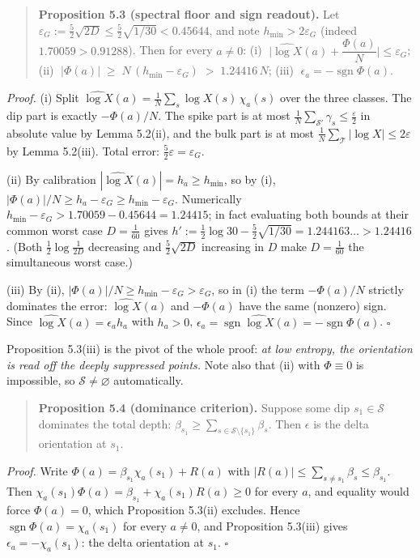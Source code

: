 \documentclass[11pt]{article}
\begin{document}
\begin{quote}
\textbf{Proposition 5.3 (spectral floor and sign readout).}  Let $\varepsilon_G := \tfrac52\sqrt{2D} \le \tfrac52\sqrt{1/30} < 0.45644$, and note $h_{\min} > 2\varepsilon_G$ (indeed $1.70059 > 0.91288$).  Then for every $a \ne 0$:  (i) $\;\Big|\widehat{\log X}(a) + \dfrac{\Phi(a)}{N}\Big| \le \varepsilon_G$;  (ii) $\;|\Phi(a)| \;\ge\; N\,(h_{\min} - \varepsilon_G) \;>\; 1.24416\,N$;  (iii) $\;\epsilon_a = -\operatorname{sgn} \Phi(a)$.
\end{quote}
\emph{Proof.}  (i) Split $\widehat{\log X}(a) = \frac1N\sum_s \log X(s)\, \chi_a(s)$ over the three classes.  The dip part is exactly $-\Phi(a)/N$.  The spike part is at most $\frac1N\sum_{\mathcal S'} \gamma_s \le \frac\varepsilon2$ in absolute value by Lemma 5.2(ii), and the bulk part is at most $\frac1N\sum_{\mathcal T}|\log X| \le 2\varepsilon$ by Lemma 5.2(iii).  Total error: $\frac52\varepsilon = \varepsilon_G$.

(ii) By calibration $|\widehat{\log X}(a)| = h_a \ge h_{\min}$, so by (i), $|\Phi(a)|/N \ge h_a - \varepsilon_G \ge h_{\min} - \varepsilon_G$. Numerically $h_{\min} - \varepsilon_G > 1.70059 - 0.45644 = 1.24415$; in fact evaluating both bounds at their common worst case $D = \tfrac1{60}$ gives $h' := \tfrac12\log30 - \tfrac52\sqrt{1/30} = 1.244163\ldots > 1.24416$.  (Both $\tfrac12\log\tfrac1{2D}$ decreasing and $\tfrac52\sqrt{2D}$ increasing in $D$ make $D = \tfrac1{60}$ the simultaneous worst case.)

(iii) By (ii), $|\Phi(a)|/N \ge h_{\min} - \varepsilon_G > \varepsilon_G$, so in (i) the term $-\Phi(a)/N$ strictly dominates the error: $\widehat{\log X}(a)$ and $-\Phi(a)$ have the same (nonzero) sign.  Since $\widehat{\log X}(a) = \epsilon_a h_a$ with $h_a > 0$, $\epsilon_a = \operatorname{sgn}\widehat{\log X}(a) = -\operatorname{sgn} \Phi(a)$.  $\square$

Proposition 5.3(iii) is the pivot of the whole proof: \emph{at low entropy, the orientation is read off the deeply suppressed points.}  Note also that (ii) with $\Phi \equiv 0$ is impossible, so $\mathcal S \ne \varnothing$ automatically.

\begin{quote}
\textbf{Proposition 5.4 (dominance criterion).}  Suppose some dip $s_1 \in \mathcal S$ dominates the total depth: $\beta_{s_1} \ge \sum_{s \in \mathcal S \setminus \{s_1\}} \beta_s$. Then $\epsilon$ is the delta orientation at $s_1$.
\end{quote}
\emph{Proof.}  Write $\Phi(a) = \beta_{s_1}\chi_a(s_1) + R(a)$ with $|R(a)| \le \sum_{s \ne s_1}\beta_s \le \beta_{s_1}$.  Then $\chi_a(s_1) \Phi(a) = \beta_{s_1} + \chi_a(s_1)R(a) \ge 0$ for every $a$, and equality would force $\Phi(a) = 0$, which Proposition 5.3(ii) excludes.  Hence $\operatorname{sgn}\Phi(a) = \chi_a(s_1)$ for every $a \ne 0$, and Proposition 5.3(iii) gives $\epsilon_a = -\chi_a(s_1)$: the delta orientation at $s_1$.  $\square$
\end{document}
